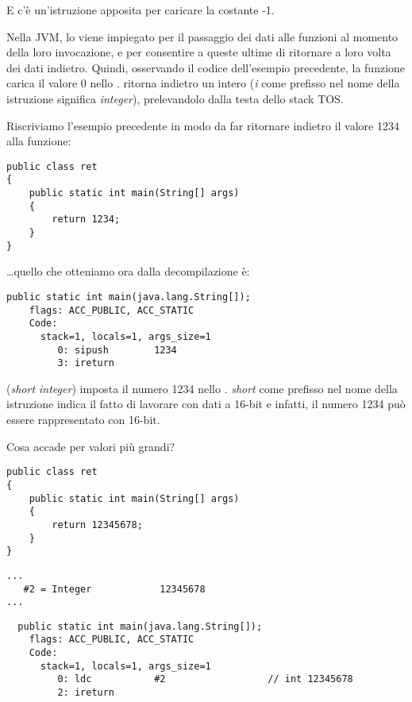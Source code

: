 E c'è un'istruzione  apposita per caricare la costante -1.

Nella JVM, lo  viene impiegato per il passaggio dei dati alle funzioni al momento della loro invocazione, 
e per consentire a queste ultime di ritornare a loro volta dei dati indietro. 
Quindi, osservando il codice dell'esempio precedente, la funzione  carica il valore 0 nello .
 ritorna indietro un intero (\emph{i} come prefisso nel nome della istruzione significa \emph{integer}), prelevandolo 
dalla testa dello stack \ac{TOS}.

Riscriviamo l'esempio precedente in modo da far ritornare indietro il valore 1234 alla funzione:

\begin{lstlisting}[style=customjava]
public class ret
{
	public static int main(String[] args)
	{
		return 1234;
	}
}
\end{lstlisting}

\dots quello che otteniamo ora dalla decompilazione è:

\begin{lstlisting}[caption=JDK 1.7 (excerpt)]
  public static int main(java.lang.String[]);
    flags: ACC_PUBLIC, ACC_STATIC
    Code:
      stack=1, locals=1, args_size=1
         0: sipush        1234
         3: ireturn
\end{lstlisting}

 (\emph{short integer}) imposta il numero 1234 nello .
\emph{short} come prefisso nel nome della istruzione indica il fatto di lavorare con dati a 16-bit e infatti,
il numero 1234 può essere rappresentato con 16-bit.

Cosa accade per valori più grandi?

\begin{lstlisting}[style=customjava]
public class ret
{
	public static int main(String[] args)
	{
		return 12345678;
	}
}
\end{lstlisting}

\begin{lstlisting}[caption=Constant pool]
...
   #2 = Integer            12345678
...
\end{lstlisting}

\begin{lstlisting}
  public static int main(java.lang.String[]);
    flags: ACC_PUBLIC, ACC_STATIC
    Code:
      stack=1, locals=1, args_size=1
         0: ldc           #2                  // int 12345678
         2: ireturn
\end{lstlisting}


